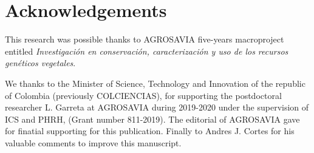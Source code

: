\documentclass{article}
\begin{document}
\section{Acknowledgements}
This research was possible thanks to AGROSAVIA five-years macroproject entitled \emph{Investigación en conservación, caracterización y uso de los recursos genéticos vegetales}.
 
We thanks to the Minister of Science, Technology and Innovation of the republic of Colombia (previously COLCIENCIAS), for supporting the postdoctoral researcher L. Garreta at AGROSAVIA during 2019-2020 under the supervision of ICS and PHRH, (Grant number 811-2019). The editorial of AGROSAVIA gave for finatial supporting for this publication. Finally to Andres J. Cortes for his valuable comments to improve this manuscript.

%
%

%
%
\end{document}
